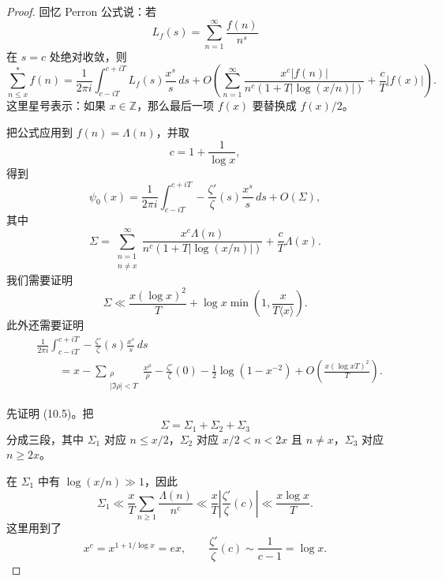 \begin{proof}
	回忆 Perron 公式说：若
	\[
		L_f(s)=\sum_{n=1}^{\infty}\frac{f(n)}{n^s}
	\]
	在 $s=c$ 处绝对收敛，则
	\[
		\sum_{n\leq x}^{*}f(n)
		=
		\frac1{2\pi i}
		\int_{c-iT}^{c+iT}
		L_f(s)\frac{x^s}{s}\,ds
		+
		O\left(
		\sum_{n=1}^{\infty}
		\frac{x^c|f(n)|}{n^c(1+T|\log(x/n)|)}
		+
		\frac{c}{T}|f(x)|
		\right).
	\]
	这里星号表示：如果 $x\in\mathbb Z$，那么最后一项 $f(x)$ 要替换成 $f(x)/2$。

	把公式应用到 $f(n)=\Lambda(n)$，并取
	\[
		c=1+\frac1{\log x},
	\]
	得到
	\[
		\psi_0(x)
		=
		\frac1{2\pi i}
		\int_{c-iT}^{c+iT}
		-\frac{\zeta'}{\zeta}(s)\frac{x^s}{s}\,ds
		+
		O(\Sigma),
	\]
	其中
	\[
		\Sigma
		=
		\sum_{\substack{n=1\\ n\neq x}}^{\infty}
		\frac{x^c\Lambda(n)}{n^c(1+T|\log(x/n)|)}
		+
		\frac{c}{T}\Lambda(x).
	\]
	我们需要证明
	\begin{equation}
		\Sigma
		\ll
		\frac{x(\log x)^2}{T}
		+
		\log x\min\left(1,\frac{x}{T\langle x\rangle}\right).
		\tag{10.5}
	\end{equation}
	此外还需要证明
	\begin{equation}
	\begin{aligned}
		&
		\frac1{2\pi i}
		\int_{c-iT}^{c+iT}
		-\frac{\zeta'}{\zeta}(s)\frac{x^s}{s}\,ds \\
		&\qquad=
		x
		-
		\sum_{\substack{\rho\\ |\Im\rho|<T}}\frac{x^\rho}{\rho}
		-
		\frac{\zeta'}{\zeta}(0)
		-
		\frac12\log(1-x^{-2})
		+
		O\left(\frac{x(\log xT)^2}{T}\right).
	\end{aligned}
		\tag{10.6}
	\end{equation}

	先证明 (10.5)。把
	\[
		\Sigma=\Sigma_1+\Sigma_2+\Sigma_3
	\]
	分成三段，其中 $\Sigma_1$ 对应 $n\leq x/2$，$\Sigma_2$ 对应
	$x/2<n<2x$ 且 $n\neq x$，$\Sigma_3$ 对应 $n\geq 2x$。

	在 $\Sigma_1$ 中有 $\log(x/n)\gg 1$，因此
	\[
		\Sigma_1
		\ll
		\frac{x}{T}\sum_{n\geq1}\frac{\Lambda(n)}{n^c}
		\ll
		\frac{x}{T}\left|\frac{\zeta'}{\zeta}(c)\right|
		\ll
		\frac{x\log x}{T}.
	\]
	这里用到了
	\[
		x^c=x^{1+1/\log x}=ex,
		\qquad
		\frac{\zeta'}{\zeta}(c)\sim \frac{1}{c-1}=\log x.
	\]


\end{proof}
